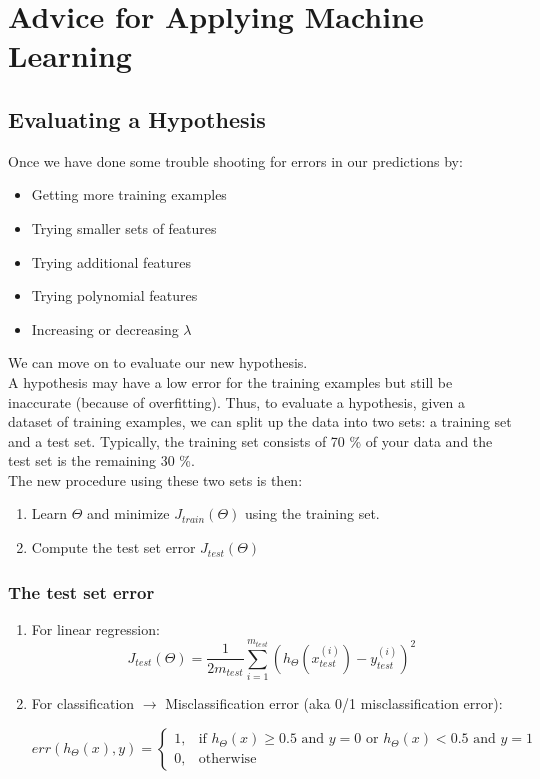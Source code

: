 \chapter{Advice for Applying Machine Learning}

\section{Evaluating a Hypothesis}

Once we have done some trouble shooting for errors in our predictions by:
\begin{itemize}
\item Getting more training examples
\item Trying smaller sets of features
\item Trying additional features
\item Trying polynomial features
\item Increasing or decreasing $\lambda$
\end{itemize}

We can move on to evaluate our new hypothesis.\\

A hypothesis may have a low error for the training examples but still be inaccurate (because of overfitting). Thus, to evaluate a hypothesis, given a dataset of training examples, we can split up the data into two sets: a training set and a test set. Typically, the training set consists of 70 \% of your data and the test set is the remaining 30 \%.\\

The new procedure using these two sets is then:\\

\begin{enumerate}
\item Learn $\Theta$ and minimize $J_{train}(\Theta)$ using the training set.
\item Compute the test set error $J_{test}(\Theta)$
\end{enumerate}

\subsection{The test set error}

\begin{enumerate}
\item For linear regression: $$J_{test} (\Theta) =\frac{1}{2m_{test}}\sum_{i=1}^{m_{test}}(h_\Theta(x^{(i)}_{test})-y^{(i)}_{test})^2 $$

\item For classification $\rightarrow$ Misclassification error (aka 0/1 misclassification error):

\begin{center}
$err(h_\Theta(x),y) = \begin{cases} 1, & \mbox{if } h_\Theta(x) \geq 0.5  \mbox{ and } y=0 \mbox{ or } h_\Theta(x) < 0.5 \mbox{ and } y=1 \\ 0, & \mbox{otherwise } \end{cases}$
\end{center}
\end{enumerate}

